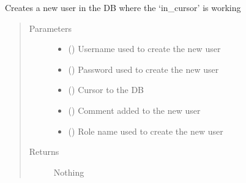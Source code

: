 \documentclass[letterpaper,10pt,english]{sphinxmanual}
\begin{document}
\begin{fulllineitems}
\label{\detokenize{CE_app:CE_app.nihpo_functions.func_nihpo_postgresql_create_user}}
\sphinxAtStartPar
Creates a new user in the DB where the ‘in\_cursor’ is working
\begin{quote}\begin{description}
\item[{Parameters}] \leavevmode\begin{itemize}
\item {} 
\sphinxAtStartPar
{} () \textendash{} Username used to create the new user

\item {} 
\sphinxAtStartPar
{} () \textendash{} Password used to create the new user

\item {} 
\sphinxAtStartPar
{} () \textendash{} Cursor to the DB

\item {} 
\sphinxAtStartPar
{} (\sphinxstyleliteralemphasis{\sphinxupquote{ (}}\sphinxstyleliteralemphasis{\sphinxupquote{)}}) \textendash{} Comment added to the new user

\item {} 
\sphinxAtStartPar
{} (\sphinxstyleliteralemphasis{\sphinxupquote{ (}}\sphinxstyleliteralemphasis{\sphinxupquote{)}}) \textendash{} Role name used to create the new user

\end{itemize}

\item[{Returns}] \leavevmode
\sphinxAtStartPar
Nothing

\end{description}\end{quote}

\end{fulllineitems}
\end{document}

